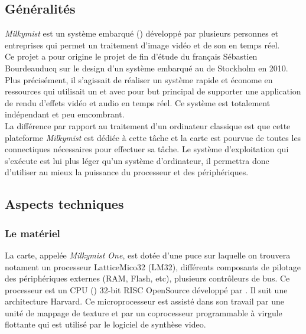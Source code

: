 
\subsection{Généralités}

\textit{Milkymist} est un système embarqué () développé par plusieurs personnes et entreprises qui permet un traitement d'image vidéo et de son en temps réel.\\
Ce projet a pour origine le projet de fin d'étude du français Sébastien Bourdeauducq \cite{BOURDEAUDUCQ} sur le design d'un système embarqué au  de Stockholm en 2010. Plus précisément, il s'agissait de réaliser un système rapide et économe en ressources qui utilisait un \fpga{} et avec pour but principal de supporter une application de rendu d'effets vidéo et audio en temps réel. Ce système est totalement indépendant et peu emcombrant.\\
La différence par rapport au traitement d'un ordinateur classique est que cette plateforme \textit{Milkymist} est dédiée à cette tâche et la carte est pourvue de toutes les connectiques nécessaires pour effectuer sa tâche. Le système d'exploitation qui s'exécute est lui plus léger qu'un système d'ordinateur, il permettra donc d'utiliser au mieux la puissance du processeur et des périphériques.

\subsection{Aspects techniques}


\subsubsection{Le matériel}

La carte, appelée \textit{Milkymist One}, est dotée d'une puce \fpga{} sur laquelle on trouvera notament un processeur LatticeMico32 (LM32)\cite{LATTICE}, différents composants de pilotage des périphériques externes (RAM, Flash, etc), plusieurs contrôleurs de bus. Ce processeur est un CPU () 32-bit  RISC OpenSource développé par . Il suit une architecture Harvard. Ce microprocesseur est assisté dans son travail par une unité de mappage de texture et par un coprocesseur programmable à virgule flottante qui est utilisé par le logiciel de synthèse video.\\

